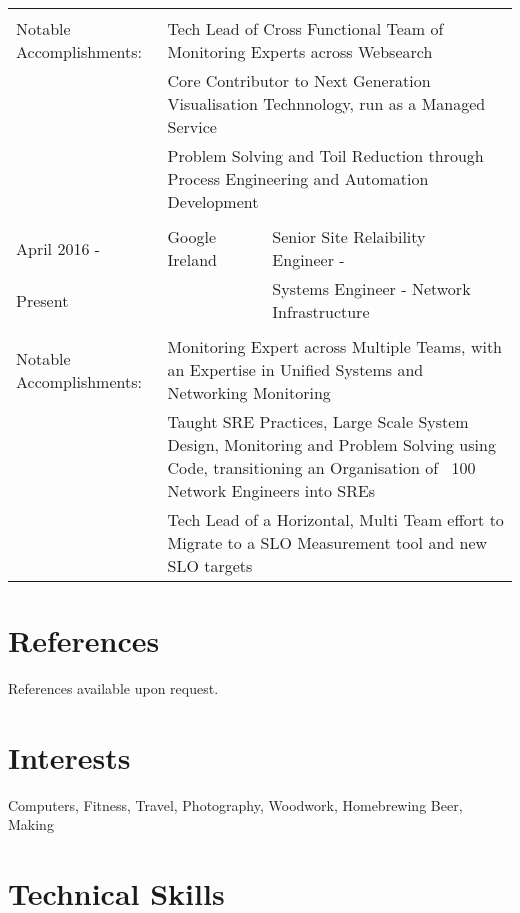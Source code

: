 \documentclass[a4paper, 11pt] {article}
\begin{document}
\begin{tabular}{llll}
      		&				&              				&            		\\
Notable Accomplishments: & \multicolumn{3}{l}{Tech Lead of Cross Functional Team of Monitoring Experts across Websearch} \\
			 & \multicolumn{3}{l}{Core Contributor to Next Generation Visualisation Technnology, run as a Managed Service} \\
			 & \multicolumn{3}{l}{Problem Solving and Toil Reduction through Process Engineering and Automation Development} \\
		& 				&					 	  &			\\
April 2016 -	&	Google Ireland		&  Senior Site Relaibility Engineer -		  &	\hspace{10mm}	\\
Present		&				&  Systems Engineer - Network Infrastructure      &            		\\
      		&				&              					  &            		\\
Notable Accomplishments: & \multicolumn{3}{l}{Monitoring Expert across Multiple Teams, with an Expertise in Unified Systems and Networking Monitoring} \\
			 & \multicolumn{3}{l}{Taught SRE Practices, Large Scale System Design, Monitoring and Problem Solving using Code, transitioning an Organisation of ~100 Network Engineers into SREs} \\
			 & \multicolumn{3}{l}{Tech Lead of a Horizontal, Multi Team effort to Migrate to a SLO Measurement tool and new SLO targets} \\
			 
\end{tabular}

\pagebreak

\section*{References}

References available upon request.

\section*{Interests}

Computers, Fitness, Travel, Photography, Woodwork, Homebrewing Beer, Making

\section*{Technical Skills}
\end{document}

